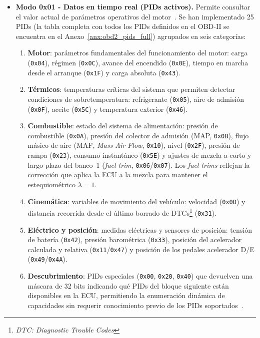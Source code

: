 \begin{itemize}
    \item \textbf{Modo 0x01 - Datos en tiempo real (PIDs activos).} Permite consultar el valor actual de parámetros operativos del motor~\cite{SAEJ1979:2014}. Se han implementado 25 PIDs (la tabla completa con todos los PIDs definidos en el OBD-II se encuentra en el Anexo~\ref{anx:obd2_pids_full}) agrupados en seis categorías:
    \begin{enumerate}
        \item \textbf{Motor}: parámetros fundamentales del funcionamiento del motor: carga (\texttt{0x04}), régimen (\texttt{0x0C}), avance del encendido (\texttt{0x0E}), tiempo en marcha desde el arranque (\texttt{0x1F}) y carga absoluta (\texttt{0x43}).
        \item \textbf{Térmicos}: temperaturas críticas del sistema que permiten detectar condiciones de sobretemperatura: refrigerante (\texttt{0x05}), aire de admisión (\texttt{0x0F}), aceite (\texttt{0x5C}) y temperatura exterior (\texttt{0x46}).
        \item \textbf{Combustible}: estado del sistema de alimentación: presión de combustible (\texttt{0x0A}), presión del colector de admisión (MAP, \texttt{0x0B}), flujo másico de aire (MAF, \textit{Mass Air Flow}, \texttt{0x10}), nivel (\texttt{0x2F}), presión de rampa (\texttt{0x23}), consumo instantáneo (\texttt{0x5E}) y ajustes de mezcla a corto y largo plazo del banco~1 (\textit{fuel trim}, \texttt{0x06}/\texttt{0x07}). Los \textit{fuel trims} reflejan la corrección que aplica la ECU a la mezcla para mantener el estequiométrico $\lambda = 1$.
        \item \textbf{Cinemática}: variables de movimiento del vehículo: velocidad (\texttt{0x0D}) y distancia recorrida desde el último borrado de DTCs\footnote{\textit{DTC: Diagnostic Trouble Codes}} (\texttt{0x31}).
        \item \textbf{Eléctrico y posición}: medidas eléctricas y sensores de posición: tensión de batería (\texttt{0x42}), presión barométrica (\texttt{0x33}), posición del acelerador calculada y relativa (\texttt{0x11}/\texttt{0x47}) y posición de los pedales acelerador D/E (\texttt{0x49}/\texttt{0x4A}).
        \item \textbf{Descubrimiento}: PIDs especiales (\texttt{0x00}, \texttt{0x20}, \texttt{0x40}) que devuelven una máscara de 32 bits indicando qué PIDs del bloque siguiente están disponibles en la ECU, permitiendo la enumeración dinámica de capacidades sin requerir conocimiento previo de los PIDs soportados~\cite{SAEJ1979:2014}.
    \end{enumerate}


\end{itemize}
